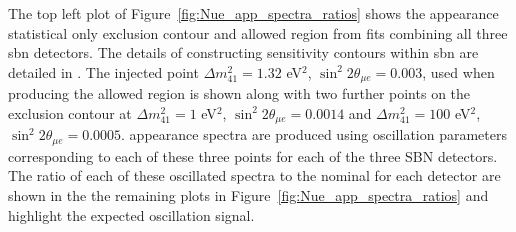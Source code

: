 \newpage
The top left plot of Figure~\ref{fig:Nue_app_spectra_ratios} shows the \nue appearance statistical only exclusion contour and allowed region from fits combining all three \gls{sbn} detectors. The details of constructing sensitivity contours within \gls{sbn} are detailed in . The injected point $\Delta m^2_{41} = 1.32$ eV$^2$, $\sin^2{2\theta_{\mu e}} = 0.003$, used when producing the allowed region is shown along with two further points on the exclusion contour at $\Delta m^2_{41} = 1$ eV$^2$, $\sin^2{2\theta_{\mu e}} = 0.0014$ and $\Delta m^2_{41} = 100$ eV$^2$, $\sin^2{2\theta_{\mu e}} = 0.0005$. \nue appearance spectra are produced using oscillation parameters corresponding to each of these three points for each of the three SBN detectors. The ratio of each of these oscillated spectra to the nominal for each detector are shown in the the remaining plots in Figure~\ref{fig:Nue_app_spectra_ratios} and highlight the expected oscillation signal.


